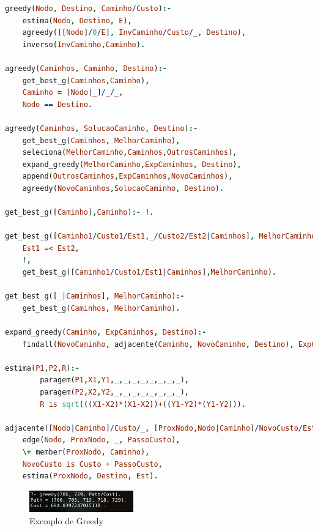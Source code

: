 \documentclass[a4paper]{report}
\begin{document}
\begin{lstlisting}[language=Prolog]
greedy(Nodo, Destino, Caminho/Custo):-
    estima(Nodo, Destino, E),
    agreedy([[Nodo]/0/E], InvCaminho/Custo/_, Destino),
    inverso(InvCaminho,Caminho).

agreedy(Caminhos, Caminho, Destino):-
    get_best_g(Caminhos,Caminho),
    Caminho = [Nodo|_]/_/_,
    Nodo == Destino.

agreedy(Caminhos, SolucaoCaminho, Destino):-
    get_best_g(Caminhos, MelhorCaminho),
    seleciona(MelhorCaminho,Caminhos,OutrosCaminhos),
    expand_greedy(MelhorCaminho,ExpCaminhos, Destino),
    append(OutrosCaminhos,ExpCaminhos,NovoCaminhos),
    agreedy(NovoCaminhos,SolucaoCaminho, Destino).

get_best_g([Caminho],Caminho):- !.

get_best_g([Caminho1/Custo1/Est1,_/Custo2/Est2|Caminhos], MelhorCaminho):-
    Est1 =< Est2,
    !,
    get_best_g([Caminho1/Custo1/Est1|Caminhos],MelhorCaminho).

get_best_g([_|Caminhos], MelhorCaminho):-
    get_best_g(Caminhos, MelhorCaminho).

expand_greedy(Caminho, ExpCaminhos, Destino):-
    findall(NovoCaminho, adjacente(Caminho, NovoCaminho, Destino), ExpCaminhos).

estima(P1,P2,R):-
        paragem(P1,X1,Y1,_,_,_,_,_,_,_,_),
        paragem(P2,X2,Y2,_,_,_,_,_,_,_,_),
        R is sqrt(((X1-X2)*(X1-X2))+((Y1-Y2)*(Y1-Y2))).

adjacente([Nodo|Caminho]/Custo/_, [ProxNodo,Nodo|Caminho]/NovoCusto/Est, Destino):-
    edge(Nodo, ProxNodo, _, PassoCusto),
    \+ member(ProxNodo, Caminho),
    NovoCusto is Custo + PassoCusto,
    estima(ProxNodo, Destino, Est).
\end{lstlisting}

\begin{figure}[H]
    \centering 
    \includegraphics[width=0.4\textwidth]{images/greedy.png}
    \caption{Exemplo de Greedy}
\end{figure}
\end{document}
